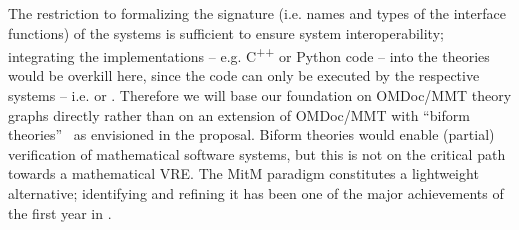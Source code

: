 The restriction to formalizing the signature (i.e. names and types of the interface
functions) of the systems is sufficient to ensure system interoperability; integrating the
implementations -- e.g. C\textsuperscript{++} or Python code -- into the theories would
be overkill here, since the code can only be executed by the respective systems --
i.e. \GAP or \SageMath. Therefore we will base our foundation on OMDoc/MMT theory graphs
directly rather than on an extension of OMDoc/MMT with ``biform
theories''~\cite{KohManRab:aumftg13,Farmer:btc07} as envisioned in the proposal. Biform
theories would enable (partial) verification of mathematical software systems, but this is
not on the critical path towards a mathematical VRE. The MitM paradigm constitutes a
lightweight alternative; identifying and refining it has been one of the major
achievements of the first year in .

